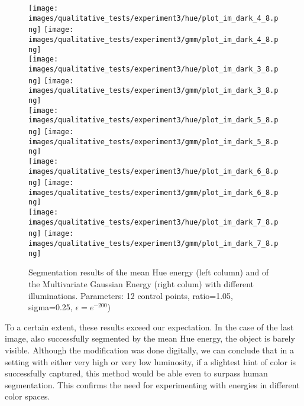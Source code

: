 \noindent
\begin{figure}[h!]
	\centering
	
	\texttt{[image: images/qualitative\_tests/experiment3/hue/plot\_im\_dark\_4\_8.png]}\hspace{0.005\textwidth}%
	\texttt{[image: images/qualitative\_tests/experiment3/gmm/plot\_im\_dark\_4\_8.png]}\\[0.em]
	
	\texttt{[image: images/qualitative\_tests/experiment3/hue/plot\_im\_dark\_3\_8.png]}\hspace{0.005\textwidth}%
	\texttt{[image: images/qualitative\_tests/experiment3/gmm/plot\_im\_dark\_3\_8.png]}\\[0.em]
	
	\texttt{[image: images/qualitative\_tests/experiment3/hue/plot\_im\_dark\_5\_8.png]}\hspace{0.005\textwidth}%
	\texttt{[image: images/qualitative\_tests/experiment3/gmm/plot\_im\_dark\_5\_8.png]}\\[0.em]
	
	\texttt{[image: images/qualitative\_tests/experiment3/hue/plot\_im\_dark\_6\_8.png]}\hspace{0.005\textwidth}%
	\texttt{[image: images/qualitative\_tests/experiment3/gmm/plot\_im\_dark\_6\_8.png]}\\[0.em]
	
	\texttt{[image: images/qualitative\_tests/experiment3/hue/plot\_im\_dark\_7\_8.png]}\hspace{0.005\textwidth}%
	\texttt{[image: images/qualitative\_tests/experiment3/gmm/plot\_im\_dark\_7\_8.png]}\\[-0.5em]
	
	\caption{Segmentation results of the mean Hue energy (left column) and of the Multivariate Gaussian Energy (right colum) with different illuminations. Parameters: 12 control points, ratio=1.05, sigma=0.25, $\epsilon = e^{-200}$)}
	\label{fig:ilumination_variation}
\end{figure}

To a certain extent, these results exceed our expectation. In the case of the last image, also successfully segmented by the mean Hue energy, the object is barely visible. Although the modification was done digitally, we can conclude that in a setting with either very high or very low luminosity, if a slightest hint of color is successfully captured, this method would be able even to surpass human segmentation. This confirms the need for experimenting with energies in different color spaces.

